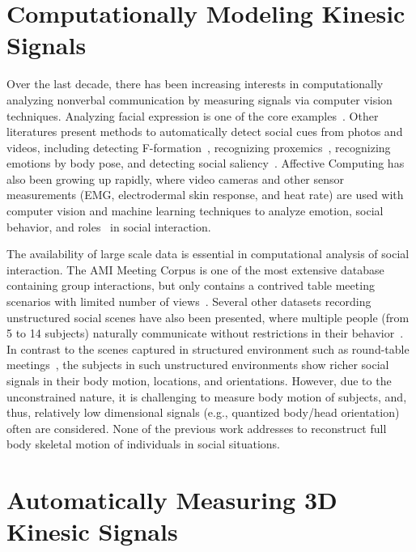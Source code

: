 \section{Computationally Modeling Kinesic Signals}
Over the last decade, there has been increasing interests in computationally analyzing nonverbal communication by measuring signals via computer vision techniques.  Analyzing facial expression is one of the core examples~\cite{ChuDC13, Torre15, shan2009facial}. Other literatures present methods to automatically detect social cues from photos and videos, including detecting F-formation~\cite{setti2015f}, recognizing proxemics~\cite{yang2012recognizing}, recognizing emotions by body pose\cite{schindler2008recognizing}, and detecting social saliency~\cite{park20123d}. Affective Computing has also been growing up rapidly, where video cameras and other sensor measurements (EMG, electrodermal skin response, and heat rate) are used with computer vision and machine learning techniques to analyze emotion, social behavior, and roles~\cite{picard1997affective} in social interaction. 

The availability of large scale data is essential in computational analysis of social interaction. The AMI Meeting Corpus is one of the most extensive database containing group interactions, but only contains a contrived table meeting scenarios with limited number of views~\cite{carletta2005ami}. Several other datasets recording unstructured social scenes have also been presented, where multiple people (from 5 to 14 subjects) naturally communicate without restrictions in their behavior~\cite{Zen-10,Cristani-11,SALSA-15}. In contrast to the scenes captured in structured environment such as round-table meetings~\cite{carletta2005ami, Lepri-12}, the subjects in such unstructured environments show richer social signals in their body motion, locations, and orientations. However, due to the unconstrained nature, it is challenging to measure body motion of subjects, and, thus, relatively low dimensional signals (e.g., quantized body/head orientation) often are considered. None of the previous work addresses to reconstruct full body skeletal motion of individuals in social situations.



\section{Automatically Measuring 3D Kinesic Signals}

